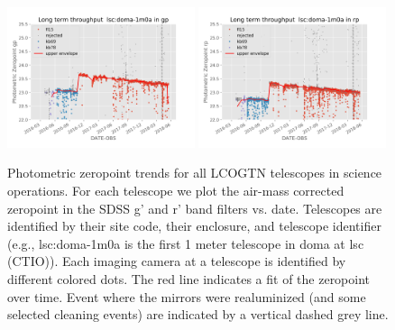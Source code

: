 \documentclass[]{spieman}
\begin{document}
\begin{figure}
\includegraphics[width=0.49\textwidth]{images/photzptrend-lsc-doma-1m0a-gp.png}  \hspace*{\fill}
\includegraphics[width=0.49\textwidth]{images/photzptrend-lsc-doma-1m0a-rp.png} \\[1ex]

\caption{\label{fig_zpLSC} Photometric zeropoint trends for all LCOGTN telescopes in science
operations. For each telescope we plot the air-mass corrected zeropoint in the SDSS g' and r' band
filters vs. date. Telescopes are identified by their site code, their enclosure, and telescope
identifier (e.g., lsc:doma-1m0a is the first 1 meter telescope in doma at lsc (CTIO)). Each imaging
camera at a telescope is identified by different colored dots. The red line indicates a fit of the
zeropoint over time. Event where the mirrors were realuminized (and some selected cleaning events)
are indicated by a vertical dashed grey line.}

\end{figure}
\end{document}
